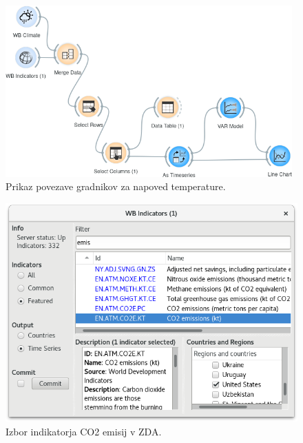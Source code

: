 \begin{figure}
\begin{center}
\includegraphics[width=11cm]{pic/var_setup.png}
\end{center}
\caption{Prikaz povezave gradnikov za napoved temperature.}
\label{var_setup}
\end{figure} 


\begin{figure}
\begin{center}
\includegraphics[width=12cm]{pic/var_indicator_select.png}
\end{center}
\caption{Izbor indikatorja CO2 emisij v ZDA.}
\label{var_indicator_select}
\end{figure} 


